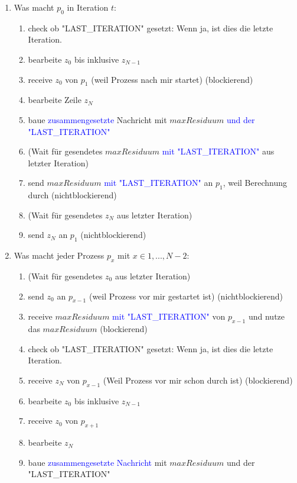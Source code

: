 \documentclass[a4paper,10pt,landscape]{article}
\begin{document}
\begin{enumerate}
    \item Was macht $p_0$ in Iteration $t$:
    \begin{enumerate}
        \color{blue}
        \item check ob "LAST\_ITERATION" gesetzt: Wenn ja, ist dies die letzte Iteration.
        \color{black}
        \item bearbeite $z_0$ bis inklusive $z_{N-1}$
        \item receive $z_0$ von $p_1$ (weil Prozess nach mir startet) (blockierend)
        \item bearbeite Zeile $z_N$
        \item baue \textcolor{blue}{zusammengesetzte} Nachricht mit $maxResiduum$ \textcolor{blue}{und der "LAST\_ITERATION"}
        \item (Wait für gesendetes $maxResiduum$ \textcolor{blue}{mit "LAST\_ITERATION"} aus letzter Iteration)
        \item send $maxResiduum$ \textcolor{blue}{mit "LAST\_ITERATION"} an $p_1$, weil Berechnung durch (nichtblockierend)
        \item (Wait für gesendetes $z_N$ aus letzter Iteration)
        \item send $z_N$ an $p_1$ (nichtblockierend)
    \end{enumerate}
    \item Was macht jeder Prozess $p_x$ mit $x \in {1,...,N-2}$:
    \begin{enumerate}
        \item (Wait für gesendetes $z_0$ aus letzter Iteration)
        \item send $z_0$ an $p_{x-1}$ (weil Prozess vor mir gestartet ist) (nichtblockierend)
        \item receive $maxResiduum$ \textcolor{blue}{mit "LAST\_ITERATION"} von $p_{x-1}$ und nutze das $maxResiduum$ (blockierend)
        \color{blue}
        \item check ob "LAST\_ITERATION" gesetzt: Wenn ja, ist dies die letzte Iteration.
        \color{black}
        \item receive $z_N$ von $p_{x-1}$ (Weil Prozess vor mir schon durch ist) (blockierend)
        \item bearbeite $z_0$ bis inklusive $z_{N-1}$
        \item receive $z_0$ von $p_{x+1}$
        \item bearbeite $z_N$
        \item baue \textcolor{blue}{zusammengesetzte Nachricht} mit $maxResiduum$ und der "LAST\_ITERATION"

\end{enumerate}
\end{enumerate}
\end{document}
